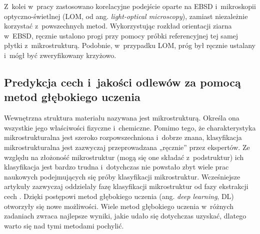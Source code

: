 Z~kolei w~pracy \cite{Britz17} zastosowano korelacyjne podejście oparte na EBSD i~mikroskopii optyczno-świetlnej (LOM, od ang. \textit{light-optical microscopy}), zamiast niezależnie korzystać z~powszechnych metod. Wykorzystując rozkład orientacji ziarna w~EBSD, ręcznie ustalono progi przy pomocy próbki referencyjnej tej samej płytki z~mikrostrukturą. Podobnie, w~przypadku LOM, próg był ręcznie ustalany i~mógł być zweryfikowany krzyżowo.

\subsection{Predykcja cech i~jakości odlewów za pomocą metod głębokiego uczenia}
\label{sub:predykcja.3}

Wewnętrzna struktura materiału nazywana jest mikrostrukturą. Określa ona wszystkie jego właściwości fizyczne i~chemiczne. Pomimo tego, że charakterystyka mikrostrukturalna jest szeroko rozpowszechniona i~dobrze znana, klasyfikacja mikrostrukturalna jest zazwyczaj przeprowadzana „ręcznie” przez ekspertów. Ze względu na złożoność mikrostruktur (mogą się one składać z~podstruktur) ich klasyfikacja jest bardzo trudna i~dotychczas nie powstało zbyt wiele prac naukowych podejmujących się próby klasyfikacji mikrostruktur. Wcześniejsze artykuły zazwyczaj oddzielały fazę klasyfikacji mikrostruktur od fazy ekstrakcji cech \cite{Azimi18}. Dzięki postępowi metod głębokiego uczenia (ang. \textit{deep learning}, DL) otworzyły się nowe możliwości. Wiele metod głębokiego uczenia w~różnych zadaniach zwraca najlepsze wyniki, jakie udało się dotychczas uzyskać, dlatego warto się nad tymi metodami pochylić. 

